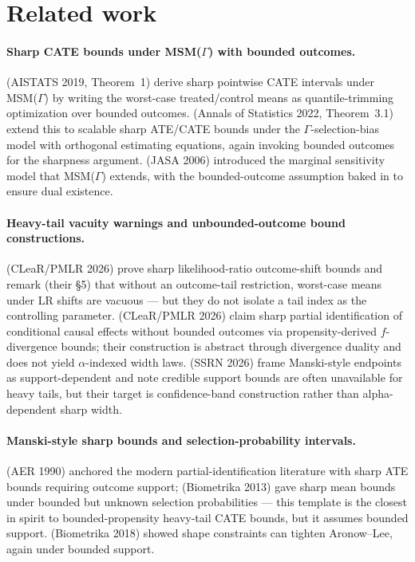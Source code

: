 \documentclass[11pt]{article}
\theoremstyle{definition}
\theoremstyle{plain}
\theoremstyle{remark}
\begin{document}
\section{Related work}

\paragraph{Sharp CATE bounds under MSM($\Gamma$) with bounded outcomes.}
\citet{KallusMaoZhou2019CATEIntervals} (AISTATS 2019, Theorem~1) derive sharp pointwise CATE intervals under MSM($\Gamma$) by writing the worst-case treated/control means as quantile-trimming optimization over bounded outcomes. \citet{YadlowskyNamkoongBasuDuchiTian2022Bounds} (Annals of Statistics 2022, Theorem~3.1) extend this to scalable sharp ATE/CATE bounds under the $\Gamma$-selection-bias model with orthogonal estimating equations, again invoking bounded outcomes for the sharpness argument. \citet{Tan2006MSM} (JASA 2006) introduced the marginal sensitivity model that MSM($\Gamma$) extends, with the bounded-outcome assumption baked in to ensure dual existence.

\paragraph{Heavy-tail vacuity warnings and unbounded-outcome bound constructions.}
\citet{AsiaeePalBeckHuling2026SharpGeneralization} (CLeaR/PMLR 2026) prove sharp likelihood-ratio outcome-shift bounds and remark (their \S 5) that without an outcome-tail restriction, worst-case means under LR shifts are vacuous --- but they do not isolate a tail index as the controlling parameter. \citet{JungKang2026ITBounds} (CLeaR/PMLR 2026) claim sharp partial identification of conditional causal effects without bounded outcomes via propensity-derived $f$-divergence bounds; their construction is abstract through divergence duality and does not yield $\alpha$-indexed width laws. \citet{LordanSalehzadehNobari2026TailUncertainty} (SSRN 2026) frame Manski-style endpoints as support-dependent and note credible support bounds are often unavailable for heavy tails, but their target is confidence-band construction rather than alpha-dependent sharp width.

\paragraph{Manski-style sharp bounds and selection-probability intervals.}
\citet{Manski1990AERBounds} (AER 1990) anchored the modern partial-identification literature with sharp ATE bounds requiring outcome support; \citet{AronowLee2013BoundedSelection} (Biometrika 2013) gave sharp mean bounds under bounded but unknown selection probabilities --- this template is the closest in spirit to bounded-propensity heavy-tail CATE bounds, but it assumes bounded support. \citet{MiratrixWagerZubizarreta2018ShapeConstrained} (Biometrika 2018) showed shape constraints can tighten Aronow--Lee, again under bounded support.
\end{document}
